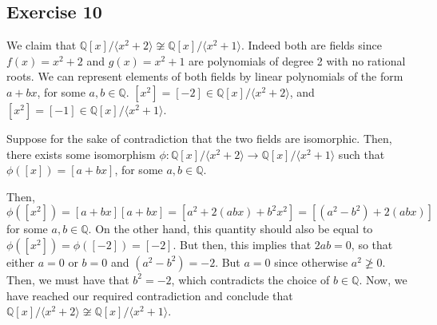 \subsection*{Exercise 10}
We claim that $\mathbb{Q}[x]/\langle x^2+2\rangle \not\cong \mathbb{Q}[x]/\langle x^2+1\rangle$. Indeed both are fields since $f(x) = x^2 + 2$ and $g(x) = x^2 + 1$ are polynomials of degree 2 with no rational roots. We can represent elements of both fields by linear polynomials of the form $a + bx$, for some $a,b \in \mathbb{Q}$. $[x^2] = [-2] \in \mathbb{Q}[x]/\langle x^2+2\rangle$, and $[x^2] = [-1] \in \mathbb{Q}[x]/\langle x^2+1\rangle$.

Suppose for the sake of contradiction that the two fields are isomorphic. Then, there exists some isomorphism $\phi: \mathbb{Q}[x]/\langle x^2+2\rangle \rightarrow \mathbb{Q}[x]/\langle x^2+1\rangle$ such that $\phi([x]) = [a+bx]$, for some $a,b \in \mathbb{Q}$.

Then, $\phi([x^2]) = [a+bx][a+bx] = [a^2 + 2(abx) + b^2x^2]  = [(a^2 - b^2) + 2(abx)]$ for some $a,b \in \mathbb{Q}$. On the other hand, this quantity should also be equal to $\phi([x^2]) = \phi([-2]) = [-2]$. But then, this implies that $2ab = 0$, so that either $a=0$ or $b=0$ and $(a^2 - b^2) = -2$. But $a = 0$ since otherwise $a^2 \not\ge 0$. Then, we must have that $b^2 = -2$, which contradicts the choice of $b \in \mathbb{Q}$. Now, we have reached our required contradiction and conclude that $\mathbb{Q}[x]/\langle x^2+2\rangle \not\cong \mathbb{Q}[x]/\langle x^2+1\rangle$.